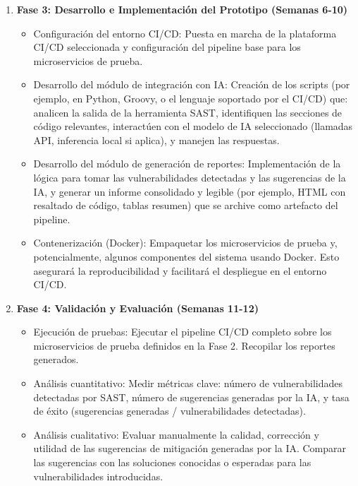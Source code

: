 \begin{enumerate}
    \item \textbf{Fase 3: Desarrollo e Implementación del Prototipo (Semanas 6-10)}
    \begin{itemize}
        \item Configuración del entorno CI/CD: Puesta en marcha de la plataforma CI/CD seleccionada y configuración del pipeline base para los microservicios de prueba.
        \item Desarrollo del módulo de integración con IA: Creación de los scripts (por ejemplo, en Python, Groovy, o el lenguaje soportado por el CI/CD) que: analicen la salida de la herramienta SAST, identifiquen las secciones de código relevantes, interactúen con el modelo de IA seleccionado (llamadas API, inferencia local si aplica), y manejen las respuestas.
        \item Desarrollo del módulo de generación de reportes: Implementación de la lógica para tomar las vulnerabilidades detectadas y las sugerencias de la IA, y generar un informe consolidado y legible (por ejemplo, HTML con resaltado de código, tablas resumen) que se archive como artefacto del pipeline.
        \item Contenerización (Docker): Empaquetar los microservicios de prueba y, potencialmente, algunos componentes del sistema usando Docker. Esto asegurará la reproducibilidad y facilitará el despliegue en el entorno CI/CD.
    \end{itemize}
    
    \item \textbf{Fase 4: Validación y Evaluación (Semanas 11-12)}
    \begin{itemize}
        \item Ejecución de pruebas: Ejecutar el pipeline CI/CD completo sobre los microservicios de prueba definidos en la Fase 2. Recopilar los reportes generados.
        \item Análisis cuantitativo: Medir métricas clave: número de vulnerabilidades detectadas por SAST, número de sugerencias generadas por la IA, y tasa de éxito (sugerencias generadas / vulnerabilidades detectadas).
        \item Análisis cualitativo: Evaluar manualmente la calidad, corrección y utilidad de las sugerencias de mitigación generadas por la IA. Comparar las sugerencias con las soluciones conocidas o esperadas para las vulnerabilidades introducidas.
    \end{itemize}
\end{enumerate}